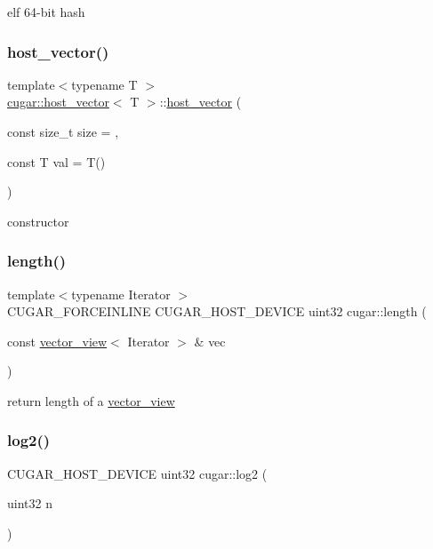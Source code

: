 elf 64-\/bit hash \mbox{\label{group___basic_gaada99b7771790a67817b7280b75d8b19}} 
\subsubsection{\texorpdfstring{host\+\_\+vector()}{host\_vector()}}
{\footnotesize\ttfamily template$<$typename T $>$ \\
\hyperlink{structcugar_1_1host__vector}{cugar\+::host\+\_\+vector}$<$ T $>$\+::\hyperlink{structcugar_1_1host__vector}{host\+\_\+vector} (\begin{DoxyParamCaption}\item[{const size\+\_\+t}]{size = {},  }\item[{const T}]{val = {\ttfamily T()} }\end{DoxyParamCaption})\hspace{0.3cm}{\ttfamily [inline]}}

constructor \mbox{\label{group___basic_ga6a0f89325f62dc313d300e36f2a26b55}} 
\subsubsection{\texorpdfstring{length()}{length()}}
{\footnotesize\ttfamily template$<$typename Iterator $>$ \\
C\+U\+G\+A\+R\+\_\+\+F\+O\+R\+C\+E\+I\+N\+L\+I\+NE C\+U\+G\+A\+R\+\_\+\+H\+O\+S\+T\+\_\+\+D\+E\+V\+I\+CE uint32 cugar\+::length (\begin{DoxyParamCaption}\item[{const \hyperlink{structcugar_1_1vector__view}{vector\+\_\+view}$<$ Iterator $>$ \&}]{vec }\end{DoxyParamCaption})}

return length of a \hyperlink{structcugar_1_1vector__view}{vector\+\_\+view} \mbox{\label{group___basic_gacde218a6ddefd0151e099ff9dc2967f5}} 
\subsubsection{\texorpdfstring{log2()}{log2()}}
{\footnotesize\ttfamily C\+U\+G\+A\+R\+\_\+\+H\+O\+S\+T\+\_\+\+D\+E\+V\+I\+CE uint32 cugar\+::log2 (\begin{DoxyParamCaption}\item[{uint32}]{n }\end{DoxyParamCaption})\hspace{0.3cm}{\ttfamily [inline]}}

